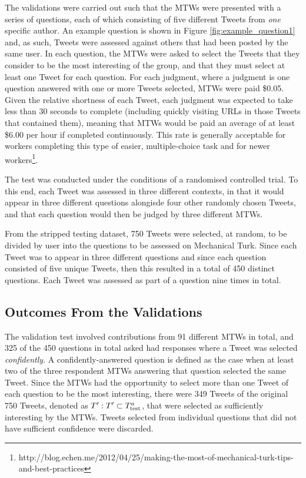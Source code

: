 The validations were carried out such that the MTWs were presented with a series of questions, each of which consisting of five different Tweets from \textit{one} specific author. An example question is shown in Figure \ref{fig:example_question1} and, as such, Tweets were assessed against others that had been posted by the same user. In each question, the MTWs were asked to select the Tweets that they consider to be the most interesting of the group, and that they must select at least one Tweet for each question. For each judgment, where a judgment is one question answered with one or more Tweets selected, MTWs were paid \$0.05. Given the relative shortness of each Tweet, each judgment was expected to take less than 30 seconds to complete (including quickly visiting URLs in those Tweets that contained them), meaning that MTWs would be paid an average of at least \$6.00 per hour if completed continuously. This rate is generally acceptable for workers completing this type of easier, multiple-choice task and for newer workers\footnote{http://blog.echen.me/2012/04/25/making-the-most-of-mechanical-turk-tips-and-best-practices}.

The test was conducted under the conditions of a randomised controlled trial. To this end, each Tweet was assessed in three different contexts, in that it would appear in three different questions alongisde four other randomly chosen Tweets, and that each question would then be judged by three different MTWs.

From the stripped testing dataset, 750 Tweets were selected, at random, to be divided by user into the questions to be assessed on Mechanical Turk. Since each Tweet was to appear in three different questions and since each question consisted of five unique Tweets, then this resulted in a total of 450 distinct questions. Each Tweet was assessed as part of a question nine times in total. 


\subsection{Outcomes From the Validations}
The validation test involved contributions from 91 different MTWs in total, and 325 of the 450 questions in total asked had responses where a Tweet was selected \textit{confidently}. A confidently-answered question is defined as the case when at least two of the three respondent MTWs answering that question selected the same Tweet. Since the MTWs had the opportunity to select more than one Tweet of each question to be the most interesting, there were 349 Tweets of the original 750 Tweets, denoted as $T' : T' \subset T^a_{\textrm{test}}{}$, that were selected as sufficiently interesting by the MTWs. Tweets selected from individual questions that did not have sufficient confidence were discarded.

